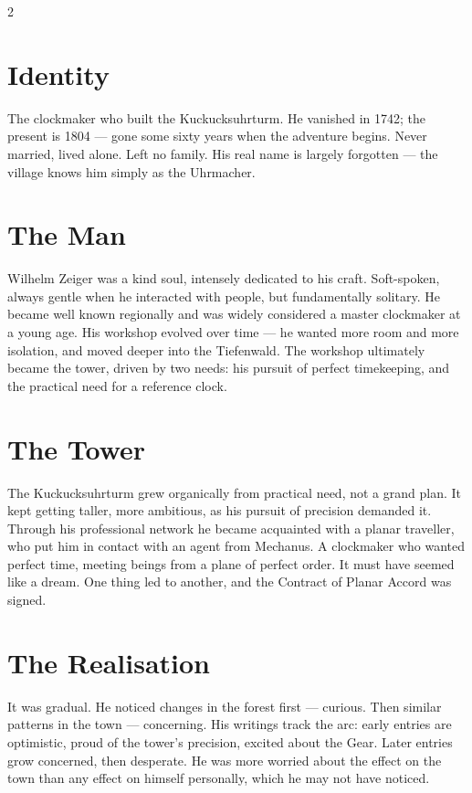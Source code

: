 \documentclass[10pt,letterpaper]{article}
\begin{document}
\begin{multicols}{2}

\section*{Identity}
The clockmaker who built the Kuckucksuhrturm. He vanished in 1742; the present is 1804 --- gone some sixty years when the adventure begins. Never married, lived alone. Left no family. His real name is largely forgotten --- the village knows him simply as the Uhrmacher.

\section*{The Man}
Wilhelm Zeiger was a kind soul, intensely dedicated to his craft. Soft-spoken, always gentle when he interacted with people, but fundamentally solitary. He became well known regionally and was widely considered a master clockmaker at a young age. His workshop evolved over time --- he wanted more room and more isolation, and moved deeper into the Tiefenwald. The workshop ultimately became the tower, driven by two needs: his pursuit of perfect timekeeping, and the practical need for a reference clock.

\section*{The Tower}
The Kuckucksuhrturm grew organically from practical need, not a grand plan. It kept getting taller, more ambitious, as his pursuit of precision demanded it. Through his professional network he became acquainted with a planar traveller, who put him in contact with an agent from Mechanus. A clockmaker who wanted perfect time, meeting beings from a plane of perfect order. It must have seemed like a dream. One thing led to another, and the Contract of Planar Accord was signed.

\section*{The Realisation}
It was gradual. He noticed changes in the forest first --- curious. Then similar patterns in the town --- concerning. His writings track the arc: early entries are optimistic, proud of the tower's precision, excited about the Gear. Later entries grow concerned, then desperate. He was more worried about the effect on the town than any effect on himself personally, which he may not have noticed.


\end{multicols}
\end{document}

